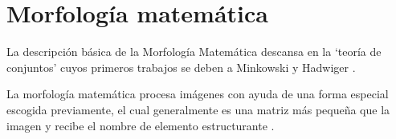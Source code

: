 


    



    
 

\section{Morfología matemática}
La descripción básica de la Morfología Matemática descansa en la ‘teoría de conjuntos’ cuyos primeros trabajos se deben a Minkowski \cite{minkowski1989allgemeine}  y Hadwiger \cite{der1957vorlesungen,hadwiger1959normale}. 



La  morfología  matemática  procesa  imágenes con ayuda de una forma especial escogida previamente, el cual generalmente es una matriz más pequeña que la imagen y recibe el nombre de elemento estructurante \cite{sonka2008image,cui2008edge}.
